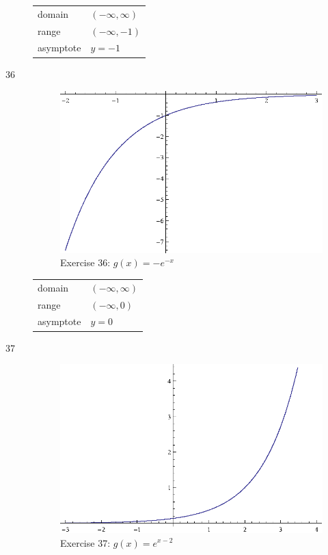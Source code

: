 \documentclass{exam}
\begin{document}
\begin{description}
        \begin{tabular}[H]{ll}
          \toprule
          domain    & $(-\infty, \infty)$ \\
          range     & $(-\infty, -1)$ \\
          asymptote & $y = -1$ \\
          \bottomrule
        \end{tabular}

      \item[36] 
        \begin{figure}[H]
          \centering
          \includegraphics[scale=0.9]{exercise36.eps}
          \caption*{Exercise 36: $g(x) = -e^{-x}$}
        \end{figure}

        \begin{tabular}[H]{ll}
          \toprule
          domain    & $(-\infty, \infty)$ \\
          range     & $(-\infty, 0)$ \\
          asymptote & $y = 0$ \\
          \bottomrule
        \end{tabular}

      \item[37] 
        \begin{figure}[H]
          \centering
          \includegraphics[scale=0.9]{exercise37.eps}
          \caption*{Exercise 37: $g(x) = e^{x - 2}$}
        \end{figure}


\end{description}
\end{document}
